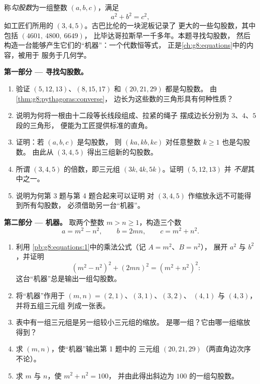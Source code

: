 \begin{problem}[{周末问题 --- 整数直角三角形，
以及恒等式 $(m^2 - n^2)^2 + (2mn)^2 = (m^2 + n^2)^2$，
它能生成全部此类三角形}]
\label{pb:g8:pythagoras:1}
称\emph{勾股数}为一组整数
$(a, b, c)$，满足
\[
a^2 + b^2 = c^2 ,
\]
如工匠们所用的 $(3, 4, 5)$。古巴比伦的一块泥板记录了
更大的一些勾股数，其中包括 $(4601,\ 4800,\ 6649)$，
比毕达哥拉斯早一千多年。本题寻找勾股数，
然后构造一台能够产生它们的“机器”：一个代数恒等式，
正是\cref{ch:g8:equations}中的内容，被用于
服务于几何学。

\medskip
\noindent\textbf{第一部分 --- 寻找勾股数。}
\begin{enumerate}
  \item 验证 $(5, 12, 13)$、$(8, 15, 17)$ 和
        $(20, 21, 29)$ 都是勾股数。
        由\cref{thm:g8:pythagoras:converse}，
        边长为这些数的三角形具有何种性质？
  \item 说明为何将一根由十二段等长线段组成、拉紧的绳子
        摆成边长分别为 $3$、$4$、$5$ 段的三角形，
        便能为工匠提供标准的直角。
  \item 证明：若 $(a, b, c)$ 是勾股数，
        则 $(ka, kb, kc)$ 对任意整数 $k \geq 1$ 也是勾股数。
        由此从 $(3, 4, 5)$ 得出三组新的勾股数。
  \item 所谓 $(3, 4, 5)$ 的倍数，即三元组
        $(3k, 4k, 5k)$。证明 $(5, 12, 13)$ 并
        \emph{不是}其中之一。
  \item 说明为何第 3 题与第 4 题合起来可以证明
        对 $(3, 4, 5)$ 作缩放永远不可能得到所有勾股数，
        必须借助另一台“机器”。
\end{enumerate}

\medskip
\noindent\textbf{第二部分 --- 机器。}
取两个整数 $m > n \geq 1$，构造三个数
\[
a = m^2 - n^2,
\qquad
b = 2mn,
\qquad
c = m^2 + n^2 .
\]
\begin{enumerate}[resume]
  \item 利用
        \cref{pb:g8:equations:1}中的乘法公式（记 $A = m^2$、$B = n^2$），
        展开 $a^2$ 与 $b^2$，并证明
        \[
        \left(m^2 - n^2\right)^2 + (2mn)^2
        = \left(m^2 + n^2\right)^2 :
        \]
        这台“机器”总是输出一组勾股数。
  \item 将“机器”作用于 $(m, n) = (2, 1)$、$(3, 1)$、$(3, 2)$、
        $(4, 1)$ 与 $(4, 3)$，并将五组三元组
        列成一张表。
  \item 表中有一组三元组是另一组较小三元组的缩放。
        是哪一组？它由哪一组缩放得到？
  \item 求 $(m, n)$，使“机器”输出第 1 题中的
        三元组 $(20, 21, 29)$（两直角边次序不论）。
  \item 求 $m$ 与 $n$，使 $m^2 + n^2 = 100$，
        并由此得出斜边为 $100$ 的一组勾股数。
\end{enumerate}


\end{problem}
